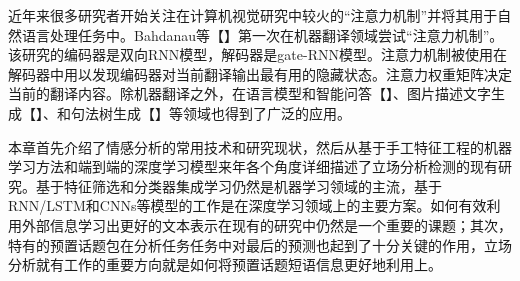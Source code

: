 近年来很多研究者开始关注在计算机视觉研究中较火的“注意力机制”并将其用于自然语言处理任务中。Bahdanau等【】第一次在机器翻译领域尝试“注意力机制”。该研究的编码器是双向RNN模型，解码器是gate-RNN模型。注意力机制被使用在解码器中用以发现编码器对当前翻译输出最有用的隐藏状态。注意力权重矩阵决定当前的翻译内容。除机器翻译之外，在语言模型和智能问答【】、图片描述文字生成【】、和句法树生成【】等领域也得到了广泛的应用。




本章首先介绍了情感分析的常用技术和研究现状，然后从基于手工特征工程的机器学习方法和端到端的深度学习模型来年各个角度详细描述了立场分析检测的现有研究。基于特征筛选和分类器集成学习仍然是机器学习领域的主流，基于RNN/LSTM和CNNs等模型的工作是在深度学习领域上的主要方案。如何有效利用外部信息学习出更好的文本表示在现有的研究中仍然是一个重要的课题；其次，特有的预置话题包在分析任务任务中对最后的预测也起到了十分关键的作用，立场分析就有工作的重要方向就是如何将预置话题短语信息更好地利用上。